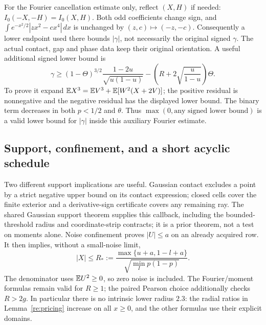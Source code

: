 For the Fourier cancellation estimate only, reflect $(X,H)$ if needed:
$I_0(-X,-H)=I_0(X,H)$. Both odd coefficients change sign, and
$\int e^{-x^2/2}|zx^2-cx^4|\,dx$ is unchanged by $(z,c)\mapsto(-z,-c)$.
Consequently a lower endpoint used there bounds $|\gamma|$, not necessarily
the original signed $\gamma$. The actual contact, gap and phase data keep
their original orientation. A useful additional signed lower bound is
\begin{equation}\label{re:gamma}
 \gamma\ge(1-\Theta)^{3/2}\frac{1-2u}{\sqrt{u(1-u)}}
       -\left(R+2\sqrt{\frac{u}{1-u}}\right)\Theta.
\end{equation}
To prove it expand $\mathbb E X^3=\mathbb E V^3+\mathbb E[W^2(X+2V)]$; the positive
residual is nonnegative and the negative residual has the displayed
lower bound. The binary term decreases in both $p<1/2$ and $\theta$.
Thus $\max(0,\text{any signed lower bound})$ is a valid lower bound for
$|\gamma|$ inside this auxiliary Fourier estimate.

\subsection{Support, confinement, and a short acyclic schedule}
Two different support implications are useful. Gaussian contact excludes
a point by a strict negative upper bound on its contact expression;
closed cells cover the finite exterior and a derivative-sign certificate
covers any remaining ray. The shared Gaussian support theorem supplies
this callback, including the bounded-threshold radius and coordinate-strip
contracts; it is a prior theorem, not a test on moments alone. Noise confinement proves $|U|\le a$ on an
already acquired row. It then implies, without a small-noise limit,
\begin{equation}\label{re:radiusfeedback}
 |X|\le R_*:=
 \frac{\max\{u+a,1-l+a\}}{\sqrt{\min_Ip(1-p)}}.
\end{equation}
The denominator uses $\mathbb E U^2\ge0$, so zero noise is included.
The Fourier/moment formulas remain valid for $R\ge1$; the paired Pearson
choice additionally checks $R>2g$. In particular there is no intrinsic
lower radius $2.3$: the radial ratios in Lemma~\ref{re:pricing} increase
on all $x\ge0$, and the other formulas use their explicit domains.


